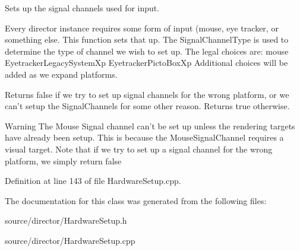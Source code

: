 Sets up the signal channels used for input. 

Every director instance requires some form of input (mouse, eye tracker, or something else. This function sets that up. The Signal\-Channel\-Type is used to determine the type of channel we wish to set up. The legal choices are\-: mouse Eyetracker\-Legacy\-System\-Xp Eyetracker\-Picto\-Box\-Xp Additional choices will be added as we expand platforms.

Returns false if we try to set up signal channels for the wrong platform, or we can't setup the Signal\-Channels for some other reason. Returns true otherwise. \begin{DoxyWarning}{Warning}
The Mouse Signal channel can't be set up unless the rendering targets have already been setup. This is because the Mouse\-Signal\-Channel requires a visual target. Note that if we try to set up a signal channel for the wrong platform, we simply return false 
\end{DoxyWarning}


Definition at line 143 of file Hardware\-Setup.\-cpp.



The documentation for this class was generated from the following files\-:\begin{DoxyCompactItemize}
\item 
source/director/Hardware\-Setup.\-h\item 
source/director/Hardware\-Setup.\-cpp\end{DoxyCompactItemize}
